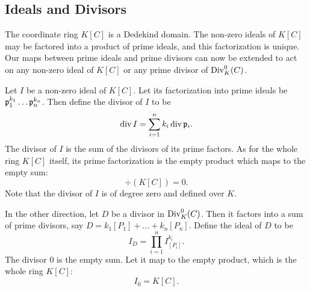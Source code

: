\begin{comment}
  ($\impliedby$) Suppose $f$ has a zero at $\sigma(P)$, i.e. $f(\sigma(x_0), \sigma(y_0)) = 0$.
  Then $\sigma$ has an inverse $\sigma\inv \in \Gal(\bar K/K)$ and
  \[ f(x_0, y_0) = \sigma\inv(\sigma(f(x_0, y_0))) = \sigma\inv(f(\sigma(x_0), \sigma(y_0))) = \sigma\inv(0) = 0. \] 
\end{proof}

\note{Not sure where to place following lemma.}
\begin{lemma}
  Let $P$ be an affine point.
  Let $I_P$ be the ideal of polynomials vanshing on $\orb(P)$.
  Then $I_P$ is a prime ideal.
\end{lemma}
\begin{proof}
  Suppose $fg \in I_P$.
  Then $0 = (fg)(P) = f(P)g(P)$.
  Since $f(P)$ and $g(P)$ are field elements in $\bar K$, either $f(P) = 0$ or $g(P) = 0$.
  By Corollary \ref{cor_orb}, either $f$ vanishes on $\orb(P)$ or $g$ vanishes on $\orb(P)$.
  Therefore at least one of $f$ or $g$ is in $I_P$.
\end{proof}
\end{comment}




\subsection{Ideals and Divisors}

The coordinate ring $K[C]$ is a Dedekind domain.
The non-zero ideals of $K[C]$ may be factored into a product of prime ideals, and this factorization is unique.
Our maps between prime ideals and prime divisors can now be extended to act on any non-zero ideal of $K[C]$ or any prime divisor of $\Div_K^0(C)$.

Let $I$ be a non-zero ideal of $K[C]$.
Let its factorization into prime ideals be $\frak p_1^{k_1} \dots \frak p_n^{k_n}$.
Then define the divisor of $I$ to be
\[ \div I = \sum_{i=1}^n k_i \div \frak p_i. \]
The divisor of $I$ is the sum of the divisors of its prime factors.
As for the whole ring $K[C]$ itself,
its prime factorization is the empty product which maps to the empty sum:
  \[ \div (K[C]) = 0. \]
Note that the divisor of $I$ is of degree zero and defined over $K$.

In the other direction, let $D$ be a divisor in $\Div_K^0(C)$.
Then it factors into a sum of prime divisors, say $D = k_1[P_1] + \dots + k_n[P_n]$.
Define the ideal of $D$ to be
\[ I_D = \prod_{i=1}^n I_{[P_i]}^{k_i}. \]
The divisor 0 is the empty sum.
Let it map to the empty product, which is the whole ring $K[C]$:
\[ I_{0} = K[C]. \]

